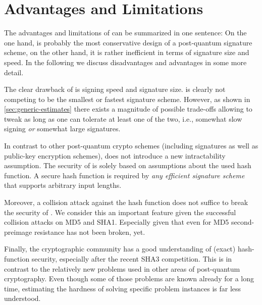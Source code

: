\section{Advantages and Limitations}
\label{sec:discussion}
%
%
The advantages and limitations of \spx can be summarized in one sentence:
On the one hand, \spx is probably the most conservative design of a post-quantum
signature scheme, on the other hand, it is rather inefficient in terms of signature
size and speed. In the following we discuss disadvantages and advantages in
some more detail.

The clear drawback of \spx is signing speed and signature size. \spx is clearly
not competing to be the smallest or fastest signature scheme. However, as shown
in \autoref{sec:generic-estimates} there exists a magnitude of possible
trade-offs allowing to tweak \spx as long as one can tolerate at least one
of the two, i.e., somewhat slow signing \emph{or} somewhat large signatures.


 In contrast to other post-quantum
crypto schemes (including signatures as well as public-key encryption schemes),
\spx does not introduce a new intractability assumption. The security of \spx
is solely based on assumptions about the used hash function.
A secure hash function is required by \emph{any efficient signature scheme}
that supports arbitrary input lengths.

Moreover, a collision attack against the hash function does not suffice to
break the security of \spx. We consider this an important feature given the
successful collision attacks on MD5 and SHA1. Especially given that even for
MD5 second-preimage resistance has not been broken, yet.

Finally, the cryptographic community has a good
understanding of (exact) hash-function security, especially after the recent SHA3
competition.  This is in contrast to the relatively new problems used in
other areas of post-quantum cryptography. Even though some of those problems are
known already for a long time, estimating the hardness of solving specific
problem instances is far less understood.

